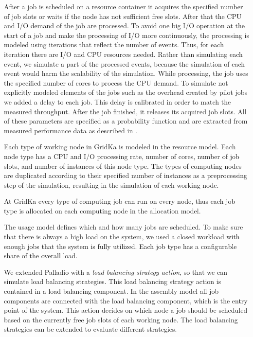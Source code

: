 \documentclass[a4paper]{jpconf}
\begin{document}
After a job is scheduled on a resource container it acquires the specified number of job slots or waits if the node has not sufficient free slots. After that the CPU and I/O demand of the job are processed. To avoid one big I/O operation at the start of a job and make the processing of I/O more continuously, the processing is modeled using iterations that reflect the number of events. Thus, for each iteration there are I/O and CPU resources needed. Rather than simulating each event, we simulate a part of the processed events, because the simulation of each event would harm the scalability of the simulation. 
While processing, the job uses the specified number of cores to process the CPU demand. To simulate not explicitly modeled elements of the jobs such as the overhead created by pilot jobs we added a delay to each job. This delay is calibrated in order to match the measured throughput. After the job finished, it releases its acquired job slots. All of these parameters are specified as a probability function and are extracted from measured performance data as described in .

Each type of working node in GridKa is modeled in the resource model. Each node type has a CPU and I/O processing rate, number of cores, number of job slots, and number of instances of this node type. The types of computing nodes are duplicated according to their specified number of instances as a preprocessing step of the simulation, resulting in the simulation of each working node.

At GridKa every type of computing job can run on every node, thus each job type is allocated on each computing node in the allocation model.

The usage model defines which and how many jobs are scheduled. To make sure that there is always a high load on the system, we used a closed workload with enough jobs that the system is fully utilized. Each job type has a configurable share of the overall load.

We extended Palladio with a \textit{load balancing strategy action}, so that we can simulate load balancing strategies.
This load balancing strategy action is contained in a load balancing component.
In the assembly model all job components are connected with the load balancing component, which is the entry point of the system.
This action decides on which node a job should be scheduled based on the currently free job slots of each working node. The load balancing strategies can be extended to evaluate different strategies.
\end{document}
